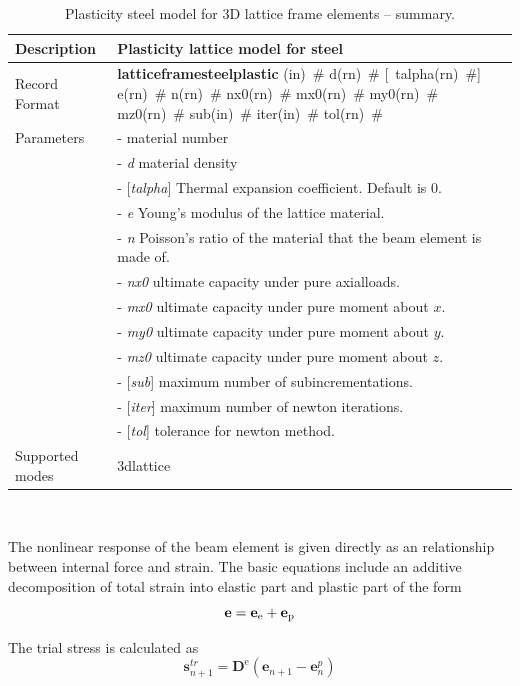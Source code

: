 \documentclass[a4paper]{article}
\newcommand{\descitem}[1]{{\noindent \bf #1}}
\newcommand{\elemparam}[2]{{{#1\tiny (#2)}~\#}}
\newcommand{\optelemparam}[2]{[{~\elemparam{#1}{#2}}]}
\newcommand{\param}[1]{{\it #1}}
\newcommand{\optparam}[1]{[{\it #1}]}
\newenvironment{mmt}{\begin{tabular}{|l|p{9cm}|}}{\end{tabular}\\}
\newenvironment{mmt}{\begin{tabular}{|l|l|}}{\end{tabular}\\}
\begin{document}
\begin{table}[!htb]
\begin{mmt}
\hline
Description & Plasticity lattice model for steel \\
\hline
Record Format & \descitem{latticeframesteelplastic} \elemparam{}{in}
\elemparam{d}{rn} \optelemparam{talpha}{rn} \elemparam{e}{rn} \elemparam{n}{rn} \elemparam{nx0}{rn} \elemparam{mx0}{rn} \elemparam{my0}{rn} \elemparam{mz0}{rn} \elemparam{sub}{in} \elemparam{iter}{in} \elemparam{tol}{rn}\\
Parameters &- \param{} material number\\
&- \param{d} material density\\
&- \optparam{talpha} Thermal expansion coefficient. Default is 0.\\
&- \param{e} Young's modulus of the lattice material.\\
&- \param{n} Poisson's ratio of the material that the beam element is made of.\\
&- \param{nx0} ultimate capacity under pure axialloads.\\
&- \param{mx0} ultimate capacity under pure moment about $x$.\\
&- \param{my0} ultimate capacity under pure moment about $y$.\\
&- \param{mz0} ultimate capacity under pure moment about $z$.\\
&- \optparam{sub} maximum number of subincrementations.\\
&- \optparam{iter} maximum number of newton iterations.\\
&- \optparam{tol} tolerance for newton method.\\
Supported modes & 3dlattice\\
\hline
\end{mmt}
\caption{Plasticity steel model for 3D lattice frame elements -- summary.}
\label{latticeframesteelplastic_table}
  \end{table}
The nonlinear response of the beam element is given directly as an relationship between internal force and strain. The basic equations include an additive decomposition of total strain into elastic part and plastic part of the form
%
\begin{equation}
    \mathbf{e} = \mathbf{e}_{\rm e}+\mathbf{e}_{\rm p} 
\end{equation}

The trial stress is calculated as
\begin{equation}
    \mathbf{s}_{n+1}^{tr}  = \mathbf{D}^{\mathrm{e}} (\mathbf{e}_{n+1}  - \mathbf{e}_n^p)
\end{equation}
\end{document}
